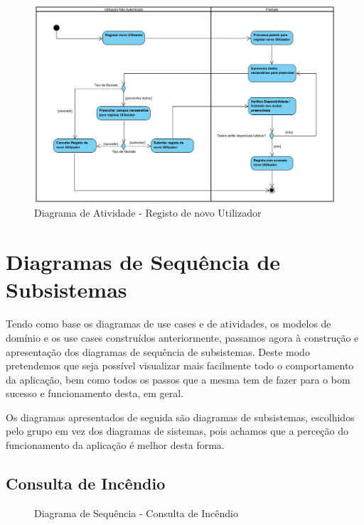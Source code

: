 \documentclass[a4paper,12pt]{scrreprt}
\newcommand{\tab}{
    \hspace{1cm}}
\begin{document}
\begin{figure}[H]
    \centering
    \includegraphics[width=.9\textwidth]{images/Fase2/6.DiagramasDeAtividade/3.atividadeRegistaUtilizador.png}
    \caption{Diagrama de Atividade - Registo de novo Utilizador}
\end{figure}


\chapter{Diagramas de Sequência de Subsistemas}

\tab Tendo como base os diagramas de use cases e de atividades, os modelos de domínio e os use cases construídos anteriormente, passamos agora à construção e apresentação dos diagramas de sequência de subsistemas. Deste modo pretendemos que seja possível visualizar mais facilmente todo o comportamento da aplicação, bem como todos os passos que a mesma tem de fazer para o bom sucesso e funcionamento desta, em geral.

\tab Os diagramas apresentados de seguida são diagramas de subsistemas, escolhidos pelo grupo em vez dos diagramas de sistemas, pois achamos que a perceção do funcionamento da aplicação é melhor desta forma.

\section{Consulta de Incêndio}

\begin{figure}[hbt!]
    \centering
    \caption{Diagrama de Sequência - Consulta de Incêndio}
\end{figure}
\end{document}
